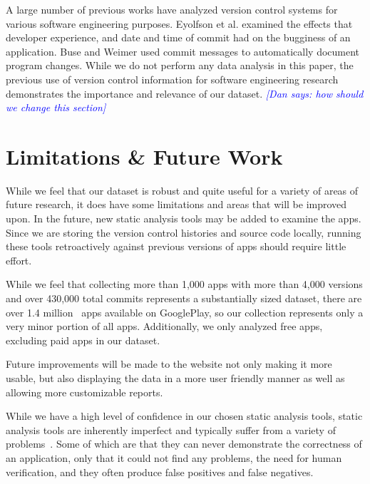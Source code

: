 \documentclass[journal,transmag]{IEEEtran}
\newcommand{\dan}[1]{\textcolor{blue}{{\it [Dan says: #1]}}}
\begin{document}
A large number of previous works have analyzed version control systems for various software engineering purposes. Eyolfson et al.\cite{Eyolfson:2011:TDD:1985441.1985464} examined the effects that developer experience, and date and time of commit had on the bugginess of an application. Buse and Weimer\cite{Buse:2010:ADP:1858996.1859005} used commit messages to automatically document program changes. While we do not perform any data analysis in this paper, the previous use of version control information for software engineering research demonstrates the importance and relevance of our dataset.
\dan{how should we change this section}



\section{Limitations \& Future Work}
\label{sec: Limitations}


While we feel that our dataset is robust and quite useful for a variety of areas of future research, it does have some limitations and areas that will be improved upon. In the future, new static analysis tools may be added to examine the apps. Since we are storing the version control histories and source code locally, running these tools retroactively against previous versions of apps should require little effort.

While we feel that collecting more than 1,000 apps with more than 4,000 versions and over 430,000 total commits represents a substantially sized dataset, there are over 1.4 million~\cite{appBrain_stats} apps available on GooglePlay, so our collection represents only a very minor portion of all apps. Additionally, we only analyzed free apps, excluding paid apps in our dataset.

Future improvements will be made to the website not only making it more usable, but also displaying the data in a more user friendly manner as well as allowing more customizable reports.

While we have a high level of confidence in our chosen static analysis tools, static analysis tools are inherently imperfect and typically suffer from a variety of problems~\cite{chess2004static}. Some of which are that they can never demonstrate the correctness of an application, only that it could not find any problems, the need for human verification, and they often produce false positives and false negatives.
\end{document}
